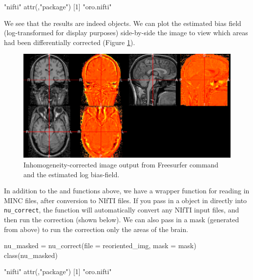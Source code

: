 \begin{Schunk}
\begin{Soutput}
[1] "nifti"
attr(,"package")
[1] "oro.nifti"
\end{Soutput}
\end{Schunk}

We see that the results are indeed  objects. We can plot the
estimated bias field (log-transformed for display purposes) side-by-side
the image to view which areas had been differentially corrected (Figure
\ref{fig:nu_correct_plot}).

\begin{Schunk}
\begin{figure}
\includegraphics{Freesurfer_files/figure-latex/nu_correct_plot-1} \caption[Inhomogeneity-corrected image output from Freesurfer  command and the estimated log bias-field]{Inhomogeneity-corrected image output from Freesurfer  command and the estimated log bias-field.}\label{fig:nu_correct_plot}
\end{figure}
\end{Schunk}

In addition to the  and  functions above, we
have a  wrapper function for reading in MINC files, after
conversion to NIfTI files. If you pass in a  object in
directly into \texttt{nu\_correct}, the function will automatically
convert any NIfTI input files, and then run the correction (shown
below). We can also pass in a mask (generated from above) to run the
correction only the areas of the brain.

\begin{Schunk}
\begin{Sinput}
nu_masked = nu_correct(file = reoriented_img, mask = mask)
class(nu_masked)
\end{Sinput}
\begin{Soutput}
[1] "nifti"
attr(,"package")
[1] "oro.nifti"
\end{Soutput}
\end{Schunk}

